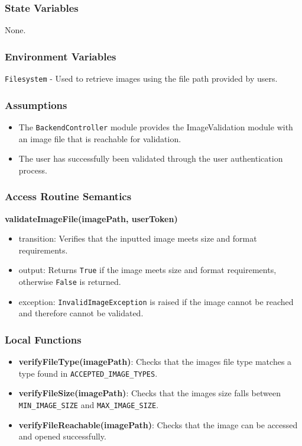 \documentclass[12pt, titlepage]{article}
\begin{document}
\subsubsection{State Variables}
None.

\subsubsection{Environment Variables}
\texttt{Filesystem} - Used to retrieve images using the file path
provided by users.

\subsubsection{Assumptions}

\begin{itemize}
  \item The \texttt{BackendController} module provides the
    ImageValidation module with an image file that is reachable for validation.
  \item The user has successfully been validated through the user
    authentication process.
\end{itemize}
\subsubsection{Access Routine Semantics}

\noindent \textbf{validateImageFile(imagePath, userToken)}
\begin{itemize}
  \item transition: Verifies that the inputted image meets size and
    format requirements.
  \item output: Returns \texttt{True} if the image meets size and
    format requirements, otherwise \texttt{False} is returned.
  \item exception: \texttt{InvalidImageException} is raised if the
    image cannot be reached and therefore cannot be validated.
\end{itemize}

\subsubsection{Local Functions}
\begin{itemize}
  \item \textbf{verifyFileType(imagePath)}: Checks that the images
    file type matches a type found in \texttt{ACCEPTED\_IMAGE\_TYPES}.
  \item \textbf{verifyFileSize(imagePath)}: Checks that the images
    size falls between \texttt{MIN\_IMAGE\_SIZE} and \texttt{MAX\_IMAGE\_SIZE}.
  \item \textbf{verifyFileReachable(imagePath)}: Checks that the
    image can be accessed and opened successfully.
\end{itemize}
\end{document}
